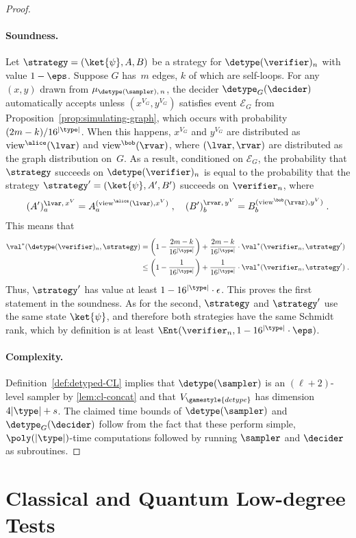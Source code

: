 \begin{proof}
\paragraph{Soundness.}
Let $\strategy = (\ket{\psi}, A, B)$ be a strategy for $\detype(\verifier)_n$
with value $1-\eps$.
Suppose $G$ has~$m$ edges, $k$ of which are self-loops.
For any $(x, y)$ drawn from $\mu_{\detype(\sampler),\, n}$, the decider
$\detype_G(\decider)$ automatically accepts unless $(x^{V_G},y^{V_G})$ satisfies
event $\mathcal{E}_G$ from Proposition~\ref{prop:simulating-graph}, which occurs
with probability $(2m-k)/16^{|\type|}$.
When this happens, $x^{V_G}$ and $y^{V_G}$ are distributed as
$\mathrm{view}^\alice(\lvar)$ and $\mathrm{view}^\bob(\rvar)$, where $(\lvar,
\rvar)$ are distributed as the graph distribution on~$G$.
As a result, conditioned on $\mathcal{E}_G$, the probability that $\strategy$
succeeds on $\detype(\verifier)_n$ is equal to the probability that the strategy
$\strategy' = (\ket{\psi}, A', B')$ succeeds on $\verifier_n$, where
\begin{equation*}
  (A')^{\lvar,\, x^V}_a = A^{(\mathrm{view}^\alice(\lvar), x^V)}_a\;, \quad
  (B')^{\rvar,\, y^V}_b = B^{(\mathrm{view}^\bob(\rvar), y^V)}_b\;.
\end{equation*}
This means that
\begin{align*}
  \val^*(\detype(\verifier)_n, \strategy)
  & = \left(1 - \frac{2m-k}{16^{|\type|}}\right) +
    \frac{2m-k}{16^{|\type|}} \cdot \val^*(\verifier_n, \strategy')\\
  & \leq \left(1 - \frac{1}{16^{|\type|}}\right) +
    \frac{1}{16^{|\type|}} \cdot \val^*(\verifier_n, \strategy')\;.
\end{align*}
Thus, $\strategy'$ has value at least $1-16^{|\type|} \cdot \epsilon$.
This proves the first statement in the soundness.
As for the second, $\strategy$ and $\strategy'$ use the same state $\ket{\psi}$,
and therefore both strategies have the same Schmidt rank, which by definition is
at least $\Ent(\verifier_n,1 - 16^{|\type|} \cdot\eps)$.

\paragraph{Complexity.}
Definition~\ref{def:detyped-CL} implies that $\detype(\sampler)$ is an
$(\ell+2)$-level sampler by \cref{lem:cl-concat} and that
$V_{\gamestyle{detype}}$ has dimension $4|\type| + s$.
The claimed time bounds of $\detype(\sampler)$ and $\detype_G(\decider)$
follow from the fact that these perform simple, $\poly(|\type|)$-time
computations followed by running $\sampler$ and $\decider$ as subroutines.
\end{proof}


 
\section{Classical and Quantum Low-degree Tests}
